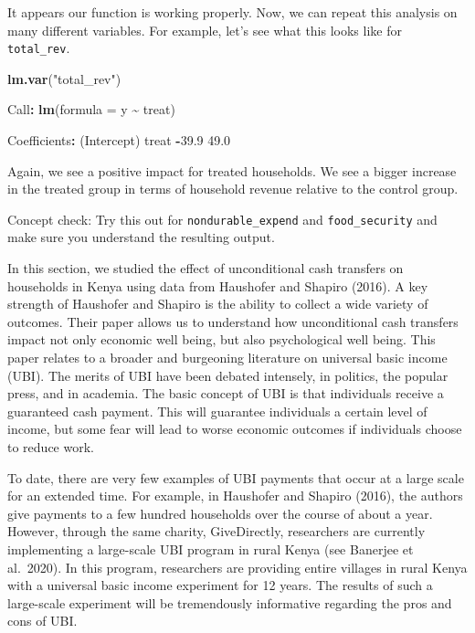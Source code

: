 \documentclass[
]{book}
\newenvironment{Shaded}{\begin{snugshade}}{\end{snugshade}}
\newcommand{\AttributeTok}[1]{\textcolor[rgb]{0.13,0.29,0.53}{#1}}
\newcommand{\FloatTok}[1]{\textcolor[rgb]{0.00,0.00,0.81}{#1}}
\newcommand{\FunctionTok}[1]{\textcolor[rgb]{0.13,0.29,0.53}{\textbf{#1}}}
\newcommand{\NormalTok}[1]{#1}
\newcommand{\SpecialCharTok}[1]{\textcolor[rgb]{0.81,0.36,0.00}{\textbf{#1}}}
\newcommand{\StringTok}[1]{\textcolor[rgb]{0.31,0.60,0.02}{#1}}
\begin{document}
It appears our function is working properly. Now, we can repeat this analysis on many different variables. For example, let's see what this looks like for \texttt{total\_rev}.

\begin{Shaded}
\begin{Highlighting}[]
\FunctionTok{lm.var}\NormalTok{(}\StringTok{"total\_rev"}\NormalTok{)}

\NormalTok{Call}\SpecialCharTok{:}
\FunctionTok{lm}\NormalTok{(}\AttributeTok{formula =}\NormalTok{ y }\SpecialCharTok{\textasciitilde{}}\NormalTok{ treat)}

\NormalTok{Coefficients}\SpecialCharTok{:}
\NormalTok{(Intercept)        treat  }
      \SpecialCharTok{{-}}\FloatTok{39.9}         \FloatTok{49.0}  
\end{Highlighting}
\end{Shaded}

Again, we see a positive impact for treated households. We see a bigger increase in the treated group in terms of household revenue relative to the control group.

Concept check: Try this out for \texttt{nondurable\_expend} and \texttt{food\_security} and make sure you understand the resulting output.

In this section, we studied the effect of unconditional cash transfers on households in Kenya using data from Haushofer and Shapiro (2016). A key strength of Haushofer and Shapiro is the ability to collect a wide variety of outcomes. Their paper allows us to understand how unconditional cash transfers impact not only economic well being, but also psychological well being.
This paper relates to a broader and burgeoning literature on universal basic income (UBI). The merits of UBI have been debated intensely, in politics, the popular press, and in academia. The basic concept of UBI is that individuals receive a guaranteed cash payment. This will guarantee individuals a certain level of income, but some fear will lead to worse economic outcomes if individuals choose to reduce work.

To date, there are very few examples of UBI payments that occur at a large scale for an extended time. For example, in Haushofer and Shapiro (2016), the authors give payments to a few hundred households over the course of about a year. However, through the same charity, GiveDirectly, researchers are currently implementing a large-scale UBI program in rural Kenya (see Banerjee et al.~2020). In this program, researchers are providing entire villages in rural Kenya with a universal basic income experiment for 12 years. The results of such a large-scale experiment will be tremendously informative regarding the pros and cons of UBI.
\end{document}
